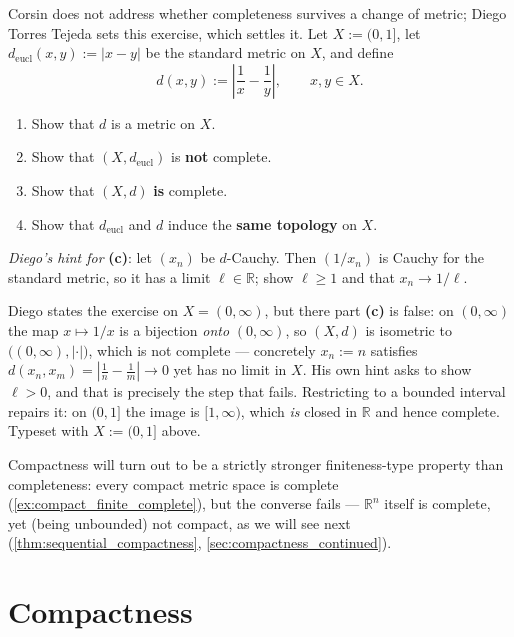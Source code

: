 \begin{exercise}
\label{ex:completeness_not_topological}
Corsin does not address whether completeness survives a change of metric; Diego Torres Tejeda
sets this exercise, which settles it. Let $X := (0,1]$, let $d_{\text{eucl}}(x,y) := |x-y|$ be
the standard metric on $X$, and define
\[d(x,y) := \left|\frac1x - \frac1y\right|, \qquad x,y \in X.\]
\begin{enumerate}[label=\textbf{(\alph*)}]
  \item Show that $d$ is a metric on $X$.
  \item Show that $(X,d_{\text{eucl}})$ is \textbf{not} complete.
  \item Show that $(X,d)$ \textbf{is} complete.
  \item Show that $d_{\text{eucl}}$ and $d$ induce the \textbf{same topology} on $X$.
\end{enumerate}
\textit{Diego's hint for} \textbf{(c)}: let $(x_n)$ be $d$-Cauchy. Then $(1/x_n)$ is Cauchy for
the standard metric, so it has a limit $\ell \in \mathbb{R}$; show $\ell \geq 1$ and that
$x_n \to 1/\ell$.
\end{exercise}

\begin{ainote}
Diego states the exercise on $X = (0,\infty)$, but there part \textbf{(c)} is false: on
$(0,\infty)$ the map $x\mapsto1/x$ is a bijection \emph{onto} $(0,\infty)$, so $(X,d)$ is
isometric to $\big((0,\infty),|\cdot|\big)$, which is not complete --- concretely $x_n := n$
satisfies $d(x_n,x_m) = |\tfrac1n-\tfrac1m| \to 0$ yet has no limit in $X$. His own hint asks to
show $\ell > 0$, and that is precisely the step that fails. Restricting to a bounded interval
repairs it: on $(0,1]$ the image is $[1,\infty)$, which \emph{is} closed in $\mathbb{R}$ and
hence complete. Typeset with $X := (0,1]$ above.
\end{ainote}

Compactness will turn out to be a strictly stronger finiteness-type property than completeness:
every compact metric space is complete (\cref{ex:compact_finite_complete}), but the converse
fails --- $\mathbb{R}^n$ itself is complete, yet (being unbounded) not compact, as we will see
next (\cref{thm:sequential_compactness}, \cref{sec:compactness_continued}).

\section{Compactness}
\label{sec:compactness}

